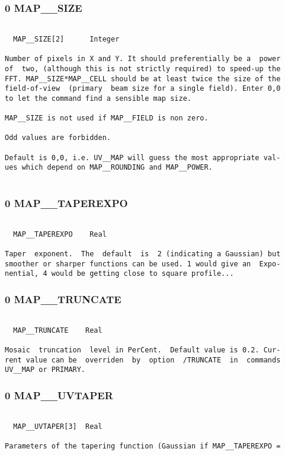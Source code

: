 \subsubsection{0 MAP\_\_SIZE}
\begin{verbatim}

  MAP__SIZE[2]      Integer

Number of pixels in X and Y. It should preferentially be a  power
of  two, (although this is not strictly required) to speed-up the
FFT. MAP__SIZE*MAP__CELL should be at least twice the size of the
field-of-view  (primary  beam size for a single field). Enter 0,0
to let the command find a sensible map size.

MAP__SIZE is not used if MAP__FIELD is non zero.

Odd values are forbidden.

Default is 0,0, i.e. UV__MAP will guess the most appropriate val-
ues which depend on MAP__ROUNDING and MAP__POWER.


\end{verbatim}
\subsubsection{0 MAP\_\_TAPEREXPO}
\begin{verbatim}

  MAP__TAPEREXPO    Real

Taper  exponent.  The  default  is  2 (indicating a Gaussian) but
smoother or sharper functions can be used. 1 would give an  Expo-
nential, 4 would be getting close to square profile...

\end{verbatim}
\subsubsection{0 MAP\_\_TRUNCATE}
\begin{verbatim}

  MAP__TRUNCATE    Real

Mosaic  truncation  level in PerCent.  Default value is 0.2. Cur-
rent value can be  overriden  by  option  /TRUNCATE  in  commands
UV__MAP or PRIMARY.

\end{verbatim}
\subsubsection{0 MAP\_\_UVTAPER}
\begin{verbatim}

  MAP__UVTAPER[3]  Real

Parameters of the tapering function (Gaussian if MAP__TAPEREXPO =
\end{verbatim}
